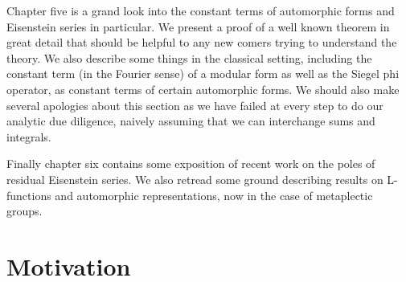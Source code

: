 Chapter five is a grand look into the constant terms of automorphic forms and Eisenstein series in particular. We present a proof of a well known theorem in great detail that should be helpful to any new comers trying to understand the theory. We also describe some things in the classical setting, including the constant term (in the Fourier sense) of a modular form as well as the Siegel phi operator, as constant terms of certain automorphic forms. We should also make several apologies about this section as we have failed at every step to do our analytic due diligence, naively assuming that we can interchange sums and integrals. 

Finally chapter six contains some exposition of recent work on the poles of residual Eisenstein series. We also retread some ground describing results on L-functions and automorphic representations, now in the case of metaplectic groups.

\section*{Motivation}
